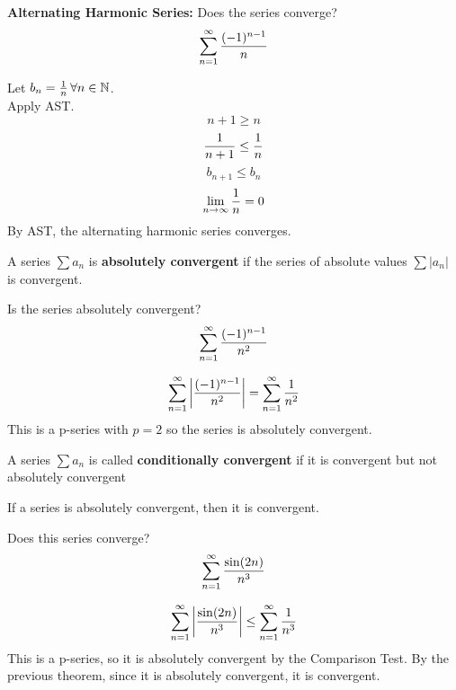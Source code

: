 \documentclass[english, 12pt]{article}
\begin{document}
\begin{exmp}
\textbf{Alternating Harmonic Series:} Does the series converge?
\[ \sum_{n=1}^\infty \frac{(-1)^{n-1}}{n} \]
\begin{sol}
Let $b_{n} = \frac{1}{n}\,\forall n \in {\mathbb{N}}$.\\
Apply AST.
\[ n+1 \geq n \]
\[\frac{1}{n+1} \leq \frac{1}{n} \]
\[b_{n+1} \leq b_{n} \]
\[\lim_{n\to\infty} \frac{1}{n} = 0 \]
By AST, the alternating harmonic series converges.
\end{sol} 
\end{exmp}
\begin{defn}
A series $\sum a_{n}$ is \textbf{absolutely convergent} if the series of absolute values $\sum |a_{n}|$ is convergent.
\end{defn}
\begin{exmp}
Is the series absolutely convergent?
\[ \sum_{n=1}^\infty \frac{(-1)^{n-1}}{n^2} \]
\begin{sol}
\[ \sum_{n=1}^\infty \left|\frac{(-1)^{n-1}}{n^2}\right| = \sum_{n=1}^\infty \frac{1}{n^2} \]
This is a p-series with $p =2$ so the series is absolutely convergent.
\end{sol}
\end{exmp}
\begin{defn}
A series $\sum a_{n}$ is called \textbf{conditionally convergent} if it is convergent but not absolutely convergent
\end{defn}
\begin{thrm}
If a series is absolutely convergent, then it is convergent.
\end{thrm}
\begin{exmp}
Does this series converge?
\[ \sum_{n=1}^\infty \frac{\sin(2n)}{n^3} \]
\begin{sol}
\[ \sum_{n=1}^\infty \left| \frac{\sin(2n)}{n^3} \right| \leq \sum_{n=1}^\infty \frac{1}{n^3}\]
This is a p-series, so it is absolutely convergent by the Comparison Test. By the previous theorem, since it is absolutely convergent, it is convergent.
\end{sol}
\end{exmp}
\end{document}
